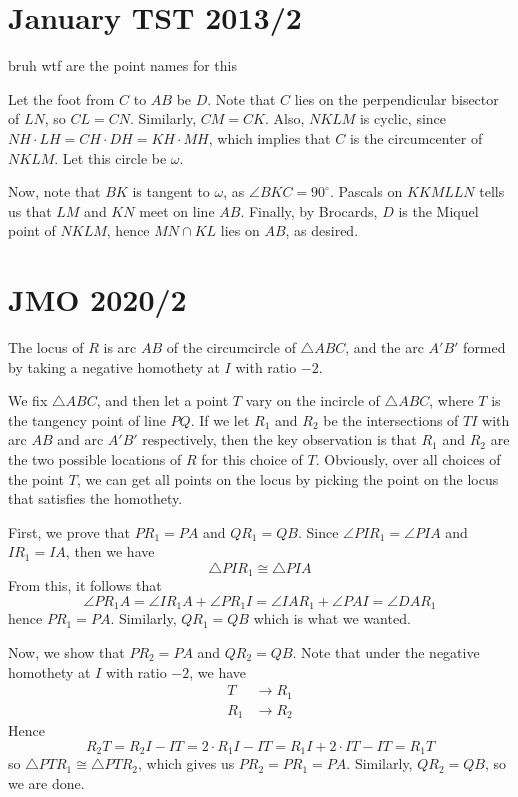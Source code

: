\documentclass[11pt]{scrartcl}
\begin{document}
\section{January TST 2013/2}
bruh wtf are the point names for this

\noindent
Let the foot from $C$ to $AB$ be $D$. Note that $C$ lies on the perpendicular bisector of $LN$, so $CL=CN$. Similarly, $CM=CK$. Also, $NKLM$ is cyclic, since $NH\cdot LH = CH \cdot DH = KH \cdot MH$, which implies that $C$ is the circumcenter of $NKLM$. Let this circle be $\omega$. 

Now, note that $BK$ is tangent to $\omega$, as $\angle BKC = 90^\circ$. Pascals on $KKMLLN$ tells us that $LM$ and $KN$ meet on line $AB$. Finally, by Brocards, $D$ is the Miquel point of $NKLM$, hence $MN\cap KL$ lies on $AB$, as desired. 

\section{JMO 2020/2}
The locus of $R$ is arc $AB$ of the circumcircle of $\triangle ABC$, and the arc $A'B'$ formed by taking a negative homothety at $I$ with ratio $-2$.

We fix $\triangle ABC$, and then let a point $T$ vary on the incircle of $\triangle ABC$, where $T$ is the tangency point of line $PQ$. If we let $R_1$ and $R_2$ be the intersections of $TI$ with arc $AB$ and arc $A'B'$ respectively, then the key observation is that $R_1$ and $R_2$ are the two possible locations of $R$ for this choice of $T$. Obviously, over all choices of the point $T$, we can get all points on the locus by picking the point on the locus that satisfies the homothety.

First, we prove that $PR_1=PA$ and $QR_1=QB$. Since $\angle PIR_1=\angle PIA$ and $IR_1=IA$, then we have
\[\triangle PIR_1 \cong \triangle PIA\]From this, it follows that
\[\angle PR_1A = \angle IR_1A + \angle PR_1I = \angle IAR_1 + \angle PAI = \angle DAR_1\]hence $PR_1=PA$. Similarly, $QR_1=QB$ which is what we wanted.

Now, we show that $PR_2=PA$ and $QR_2=QB$. Note that under the negative homothety at $I$ with ratio $-2$, we have
\begin{align*}
    T&\rightarrow R_1\\
    R_1&\rightarrow R_2
\end{align*}Hence
\[R_2T=R_2I-IT=2\cdot R_1I - IT = R_1I + 2\cdot IT - IT = R_1T\]so $\triangle PTR_1\cong \triangle PTR_2$, which gives us $PR_2=PR_1=PA$. Similarly, $QR_2=QB$, so we are done.
\end{document}
